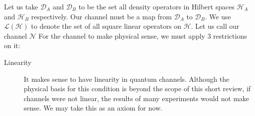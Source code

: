 Let us take $\mathcal{D}_A$ and $\mathcal{D}_B$ to be the set all density operators in Hilbert spaces
$\mathcal{H}_A$ and $\mathcal{H}_B$ respectively. Our channel must be a map from $\mathcal{D}_A$ to
$\mathcal{D}_B$. We use $\mathcal{L}(\mathcal{H})$ to denote the set of all square linear operators on 
$\mathcal{H}$. Let us call our channel $\mathcal{N}$ For the channel to make physical sense, we must
apply 3 restrictions on it:

\begin{description}
    \item[Linearity] {
        It makes sense to have linearity in quantum channels. Although the physical
        basis for this condition is beyond the scope of this short review, if channels were not
        linear, the results of many experiments would not make sense. We may take this as an axiom
        for now.
        
}
\end{description}
